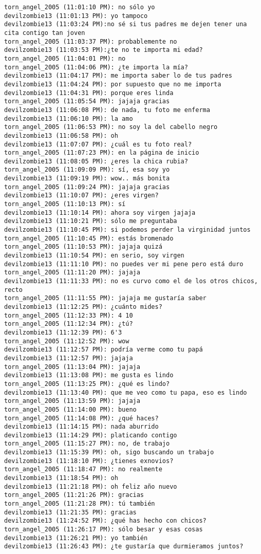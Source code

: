 \begin{verbatim}
torn_angel_2005 (11:01:10 PM): no sólo yo
devilzombie13 (11:01:13 PM): yo tampoco
devilzombie13 (11:03:24 PM):no sé si tus padres me dejen tener una cita contigo tan joven
torn_angel_2005 (11:03:37 PM): probablemente no
devilzombie13 (11:03:53 PM):¿te no te importa mi edad?
torn_angel_2005 (11:04:01 PM): no
torn_angel_2005 (11:04:06 PM): ¿te importa la mía?
devilzombie13 (11:04:17 PM): me importa saber lo de tus padres
devilzombie13 (11:04:24 PM): por supuesto que no me importa
devilzombie13 (11:04:31 PM): porque eres linda
torn_angel_2005 (11:05:54 PM): jajaja gracias
devilzombie13 (11:06:08 PM): de nada, tu foto me enferma
devilzombie13 (11:06:10 PM): la amo 
torn_angel_2005 (11:06:53 PM): no soy la del cabello negro
devilzombie13 (11:06:58 PM): oh
devilzombie13 (11:07:07 PM): ¿cuál es tu foto real?
torn_angel_2005 (11:07:23 PM): en la página de inicio 
devilzombie13 (11:08:05 PM): ¿eres la chica rubia?
torn_angel_2005 (11:09:09 PM): sí, esa soy yo
devilzombie13 (11:09:19 PM): wow.. más bonita
torn_angel_2005 (11:09:24 PM): jajaja gracias
devilzombie13 (11:10:07 PM): ¿eres virgen?
torn_angel_2005 (11:10:13 PM): sí
devilzombie13 (11:10:14 PM): ahora soy virgen jajaja
devilzombie13 (11:10:21 PM): sólo me preguntaba 
devilzombie13 (11:10:45 PM): si podemos perder la virginidad juntos
torn_angel_2005 (11:10:45 PM): estás bromenado
torn_angel_2005 (11:10:53 PM): jajaja quizá
devilzombie13 (11:10:54 PM): en serio, soy virgen
devilzombie13 (11:11:10 PM): no puedes ver mi pene pero está duro
torn_angel_2005 (11:11:20 PM): jajaja
devilzombie13 (11:11:33 PM): no es curvo como el de los otros chicos, recto
torn_angel_2005 (11:11:55 PM): jajaja me gustaría saber 
devilzombie13 (11:12:25 PM): ¿cuánto mides?
torn_angel_2005 (11:12:33 PM): 4 10
torn_angel_2005 (11:12:34 PM): ¿tú?
devilzombie13 (11:12:39 PM): 6'3 
torn_angel_2005 (11:12:52 PM): wow
devilzombie13 (11:12:57 PM): podría verme como tu papá
devilzombie13 (11:12:57 PM): jajaja
torn_angel_2005 (11:13:04 PM): jajaja
devilzombie13 (11:13:08 PM): me gusta es lindo
torn_angel_2005 (11:13:25 PM): ¿qué es lindo?
devilzombie13 (11:13:40 PM): que me veo como tu papa, eso es lindo
torn_angel_2005 (11:13:59 PM): jajaja
torn_angel_2005 (11:14:00 PM): bueno
torn_angel_2005 (11:14:08 PM): ¿qué haces?
devilzombie13 (11:14:15 PM): nada aburrido
devilzombie13 (11:14:29 PM): platicando contigo
torn_angel_2005 (11:15:27 PM): no, de trabajo
devilzombie13 (11:15:39 PM): oh, sigo buscando un trabajo 
devilzombie13 (11:18:10 PM): ¿tienes exnovios? 
torn_angel_2005 (11:18:47 PM): no realmente
devilzombie13 (11:18:54 PM): oh
devilzombie13 (11:21:18 PM): oh feliz año nuevo
torn_angel_2005 (11:21:26 PM): gracias
torn_angel_2005 (11:21:28 PM): tú también
devilzombie13 (11:21:35 PM): gracias
devilzombie13 (11:24:52 PM): ¿qué has hecho con chicos?
torn_angel_2005 (11:26:17 PM): sólo besar y esas cosas
devilzombie13 (11:26:21 PM): yo también
devilzombie13 (11:26:43 PM): ¿te gustaría que durmieramos juntos? 
\end{verbatim}